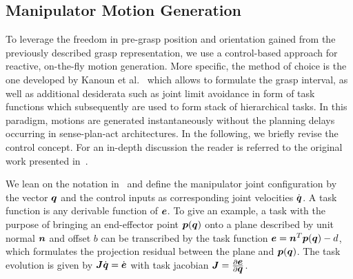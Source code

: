 \subsection{Manipulator Motion Generation}
\label{subsec:manip_motion}
%
To leverage the freedom in pre-grasp position and orientation gained from the previously described
grasp representation, we use a control-based approach for reactive, on-the-fly motion
generation. More specific, the method of choice is the one developed by Kanoun et al.~\cite{Kano11}
which allows to formulate the grasp interval, as well as additional desiderata such as joint limit
avoidance in form of task functions which subsequently are used to form stack of hierarchical
tasks. In this paradigm, motions are generated instantaneously without the planning delays occurring
in sense-plan-act architectures. In the following, we briefly revise the control concept. For an
in-depth discussion the reader is referred to the original work presented in~\cite{Kano11}.

We lean on the notation in~\cite{Esca14} and define the manipulator joint configuration by the
vector $\mbox{\boldmath $q$}$ and the control inputs as corresponding joint velocities $\dot{\mbox{\boldmath $q$}}$. A task
function is any derivable function of $\mbox{\boldmath $e$}$. To give an example, a task with the purpose of
bringing an end-effector point $\mbox{\boldmath $p$}(\mbox{\boldmath $q$})$ onto a plane described by unit normal $\mbox{\boldmath $n$}$
and offset $b$ can be transcribed by the task function $\mbox{\boldmath $e$}=\mbox{\boldmath $n$}^T\mbox{\boldmath $p$}(\mbox{\boldmath $q$})-d$, which
formulates the projection residual between the plane and $\mbox{\boldmath $p$}(\mbox{\boldmath $q$})$. The task evolution is
given by $\mbox{\boldmath $J$}\dot{\mbox{\boldmath $q$}}=\dot{\mbox{\boldmath $e$}}$ with task jacobian
$\mbox{\boldmath $J$}=\frac{\partial\mbox{\boldmath $e$}}{\partial\mbox{\boldmath $q$}}$.


